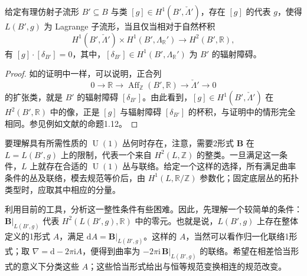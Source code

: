\begin{corollary}\label{cor:6.70}
给定有理仿射子流形 $B'\subseteq B$ 与类 $[g]\in H^1(B',\check\Lambda')$，存在 $[g]$ 的代表 $g$，使得 $L(B',g)$ 为 Lagrange 子流形，当且仅当相对于自然杯积
\[
H^1(B',\check\Lambda')\times H^1(B',\Lambda_{\mathbb R}')
\longrightarrow H^2(B',\mathbb R),
\]
有 $[g]\cdot[\delta_{B'}]=0$，其中，$[\delta_{B'}]\in H^1(B',\Lambda_{\mathbb R}')$ 为 $B'$ 的辐射障碍。
\end{corollary}
\begin{proof}
如的证明中一样，可以说明，正合列
\[
0\longrightarrow\mathbb R\longrightarrow\operatorname{Aff}_{\mathbb Z}(B',\mathbb R)
\longrightarrow\check\Lambda'\longrightarrow0
\]
的扩张类，就是 $B'$ 的辐射障碍 $[\delta_{B'}]$。由此看到，$[g]\in H^1(B',\check\Lambda')$ 在 $H^2(B',\mathbb R)$ 中的像，正是 $[g]$ 与辐射障碍 $[\delta_{B'}]$ 的杯积，与证明中的情形完全相同。参见例如文献的命题1.12。
\end{proof}

要理解具有所需性质的 $\operatorname{U}(1)$ 丛何时存在，注意，需要2形式 $\mathbf B$ 在 $L=L(B',g)$ 上的限制，代表一个来自 $H^2(L,\mathbb Z)$ 的整类。一旦满足这一条件，$L$ 上就存在合适的 $\operatorname{U}(1)$ 丛与联络。给定一个这样的选择，所有满足曲率条件的丛及联络，模去规范等价后，由 $H^1(L,\mathbb R/\mathbb Z)$ 参数化；固定底层丛的拓扑类型时，应取其中相应的分量。

利用目前的工具，分析这一整性条件有些困难。因此，先理解一个较简单的条件：$\mathbf B|_{L(B',g)}$ 代表 $H^2(L(B',g),\mathbb R)$ 中的零元。也就是说，$L(B',g)$ 上存在整体定义的1形式 $A$，满足 $\mathrm dA=\mathbf B|_{L(B',g)}$。这样的 $A$，当然可以看作归一化联络1形式；取 $\nabla=\mathrm d-2\pi\mathrm i A$，便得到曲率为 $-2\pi\mathrm i\,\mathbf B|_{L(B',g)}$ 的联络。希望在相差恰当形式的意义下分类这些 $A$；这些恰当形式给出与恒等规范变换相连的规范改变。

